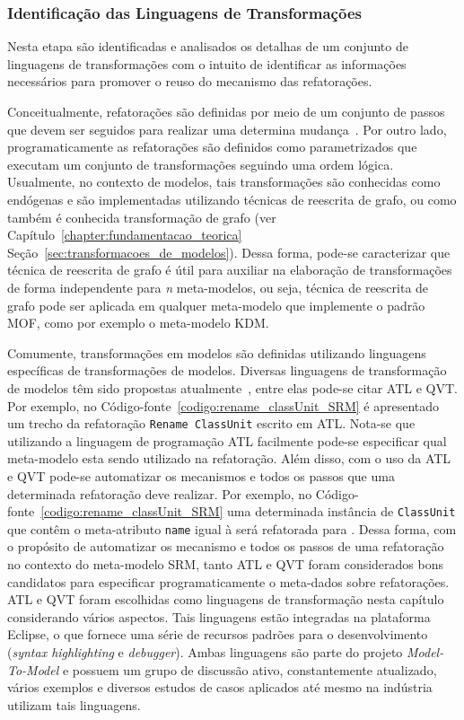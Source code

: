 \subsubsection{Identificação das Linguagens de Transformações}

Nesta etapa são identificadas e analisados os detalhas de um conjunto de linguagens de transformações com o intuito de identificar as informações necessários para promover o reuso do mecanismo das refatorações. 

Conceitualmente, refatorações são definidas por meio de um conjunto de passos que devem ser seguidos para realizar uma determina mudança~\cite{Fowler1999, Demeyer1}. Por outro lado, programaticamente as refatorações são definidos como  parametrizados que executam um conjunto de transformações seguindo uma ordem lógica. Usualmente, no contexto de modelos, tais transformações são conhecidas como endógenas e são implementadas utilizando técnicas de reescrita de grafo, ou como também é conhecida transformação de grafo (ver Capítulo~\ref{chapter:fundamentacao_teorica} Seção~\ref{sec:transformacoes_de_modelos}). Dessa forma, pode-se caracterizar que técnica de reescrita de grafo é útil para auxiliar na elaboração de transformações de forma independente para \textit{n} meta-modelos, ou seja, técnica de reescrita de grafo pode ser aplicada em qualquer meta-modelo que implemente o padrão MOF, como por exemplo o meta-modelo KDM. 

Comumente, transformações em modelos são definidas utilizando linguagens específicas de transformações de modelos. Diversas linguagens de transformação de modelos têm sido propostas atualmente~\cite{Biehl_2010, Allilaire_06}, entre elas pode-se citar ATL e QVT. Por exemplo, no Código-fonte~\ref{codigo:rename_classUnit_SRM} é apresentado um trecho da refatoração \texttt{Rename ClassUnit} escrito em ATL. Nota-se que utilizando a linguagem de programação ATL facilmente pode-se especificar qual meta-modelo esta sendo utilizado na refatoração. Além disso, com o uso da ATL e QVT pode-se automatizar os mecanismos e todos os passos que uma determinada refatoração deve realizar. Por exemplo, no Código-fonte~\ref{codigo:rename_classUnit_SRM} uma determinada instância de \texttt{ClassUnit} que contêm o meta-atributo \texttt{name} igual à  será refatorada para . Dessa forma, com o propósito de automatizar os mecanismo e todos os passos de uma refatoração no contexto do meta-modelo SRM, tanto ATL e QVT foram considerados bons candidatos para especificar programaticamente o meta-dados sobre refatorações. ATL e QVT foram escolhidas como linguagens de transformação nesta capítulo considerando vários aspectos. Tais linguagens estão integradas na plataforma Eclipse, o que fornece uma série de recursos padrões para o desenvolvimento (\textit{syntax highlighting} e \textit{debugger}). Ambas linguagens são parte do projeto \textit{Model-To-Model} e possuem um grupo de discussão ativo, constantemente atualizado, vários exemplos e diversos estudos de casos aplicados até mesmo na indústria utilizam tais linguagens.


